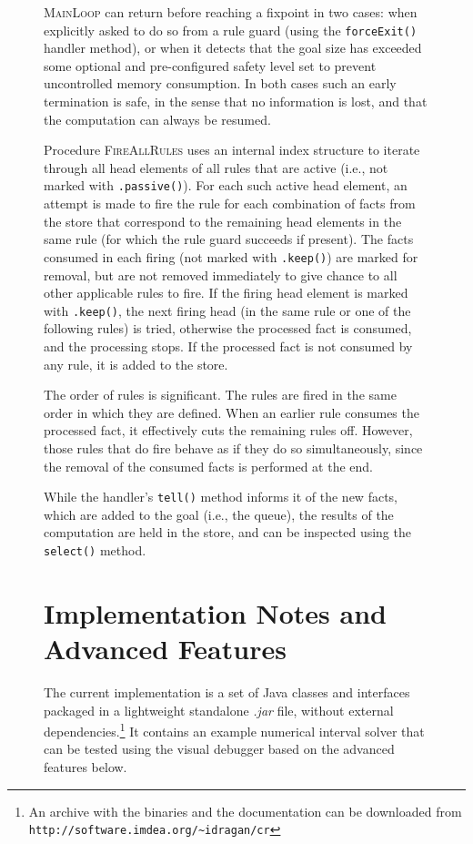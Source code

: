 \documentclass[runningheads,a4paper,11pt,dvipsname]{llncs}
\begin{document}
\begin{figure}[tb]
\begin{minipage}[t]{0.75\textwidth}
\begin{tabbing}
\textsc{MainLoop} can return before reaching a fixpoint in two cases:
when explicitly asked to do so from a rule guard (using the
\texttt{forceExit()} handler method), or when it detects that the goal
size has exceeded some optional and pre-configured safety level set to
prevent uncontrolled memory consumption.  In both cases such an early
termination is safe, in the sense that no information is lost, and
that the computation can always be resumed.

Procedure \textsc{FireAllRules} uses an internal index structure to
iterate through all head elements of all rules that are active (i.e.,
not marked with \texttt{.passive()}).  For each such active head
element, an attempt is made to fire the rule for each combination of
facts from the store that correspond to the remaining head elements in
the same rule (for which the rule guard succeeds if present).  The
facts consumed in each firing (not marked with \texttt{.keep()}) are
marked for removal, but are not removed immediately to give chance to
all other applicable rules to fire.  If the firing head element is
marked with \texttt{.keep()}, the next firing head (in the same rule
or one of the following rules) is tried, otherwise the processed fact
is consumed, and the processing stops.  If the processed fact is not
consumed by any rule, it is added to the store.

The order of rules is significant.  The rules are fired in the same
order in which they are defined.  When an earlier rule consumes the
processed fact, it effectively cuts the remaining rules off.  However,
those rules that do fire behave as if they do so simultaneously, since
the removal of the consumed facts is performed at the end.

While the handler's \texttt{tell()} method informs it of the new
facts, which are added to the goal (i.e., the queue), the results of
the computation are held in the store, and can be inspected using the
\texttt{select()} method.



\section{Implementation Notes and Advanced Features}
\label{sec:impl-notes-advanc}

The current implementation is a set of Java classes and interfaces
packaged in a lightweight standalone \emph{.jar} file, without
external dependencies.\footnote{An archive with the binaries and the documentation can be
  downloaded from \texttt{http://software.imdea.org/\~{ }idragan/cr}}
It contains an example numerical interval solver that can be tested
using the visual debugger based on the advanced features below.


\end{tabbing}
\end{minipage}
\end{figure}
\end{document}
